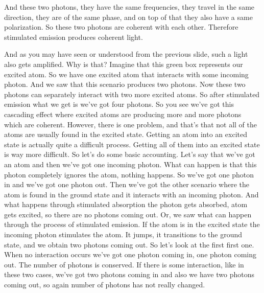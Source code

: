 And these two photons, they have the same frequencies, they travel in the same direction, they are of the same phase, and on top of that they also have a same polarization. So these two photons are coherent with each other. Therefore stimulated emission produces coherent light.

And as you may have seen or understood from the previous slide, such a light also gets amplified. Why is that? Imagine that this green box represents our excited atom. So we have one excited atom that interacts with some incoming photon. And we saw that this scenario produces two photons. Now these two photons can separately interact with two more excited atoms. So after stimulated emission what we get is we've got four photons. So you see we've got this cascading effect where excited atoms are producing more and more photons which are coherent. However, there is one problem, and that's that not all of the atoms are usually found in the excited state. Getting an atom into an excited state is actually quite a difficult process. Getting all of them into an excited state is way more difficult. So let's do some basic accounting. Let's say that we've got an atom and then we've got one incoming photon. What can happen is that this photon completely ignores the atom, nothing happens. So we've got one photon in and we've got one photon out. Then we've got the other scenario where the atom is found in the ground state and it interacts with an incoming photon. And what happens through stimulated absorption the photon gets absorbed, atom gets excited, so there are no photons coming out. Or, we saw what can happen through the process of stimulated emission. If the atom is in the excited state the incoming photon stimulates the atom. It jumps, it transitions to the ground state, and we obtain two photons coming out. So let's look at the first first one. When no interaction occurs we've got one photon coming in, one photon coming out. The number of photons is conserved. If there is some interaction, like in these two cases, we've got two photons coming in and also we have two photons coming out, so again number of photons has not really changed.

